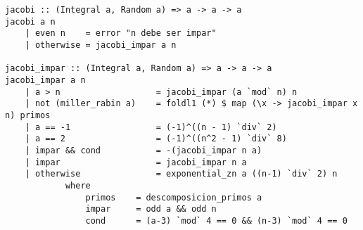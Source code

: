 \documentclass[10pt,spanish]{article}
\begin{document}
\begin{verbatim}
jacobi :: (Integral a, Random a) => a -> a -> a
jacobi a n
    | even n    = error "n debe ser impar"
    | otherwise = jacobi_impar a n

jacobi_impar :: (Integral a, Random a) => a -> a -> a
jacobi_impar a n
    | a > n                   = jacobi_impar (a `mod` n) n
    | not (miller_rabin a)    = foldl1 (*) $ map (\x -> jacobi_impar x n) primos
    | a == -1                 = (-1)^((n - 1) `div` 2)
    | a == 2                  = (-1)^((n^2 - 1) `div` 8)
    | impar && cond           = -(jacobi_impar n a)
    | impar                   = jacobi_impar n a
    | otherwise               = exponential_zn a ((n-1) `div` 2) n
            where
                primos    = descomposicion_primos a
                impar     = odd a && odd n 
                cond      = (a-3) `mod` 4 == 0 && (n-3) `mod` 4 == 0
\end{verbatim}
\end{document}
